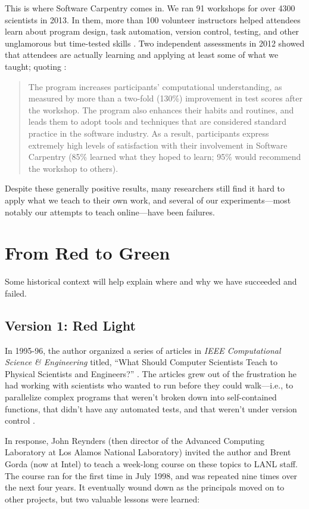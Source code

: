 \documentclass[10pt,a4paper,twocolumn]{article}
\begin{document}
This is where Software Carpentry comes in. We ran 91 workshops for
over 4300 scientists in 2013. In them, more than 100 volunteer
instructors helped attendees learn about program design, task
automation, version control, testing, and other unglamorous but
time-tested skills \cite{wilson2013}. Two independent assessments in
2012 showed that attendees are actually learning and applying at least
some of what we taught; quoting \cite{aranda2012}:

\begin{quote}
The program increases participants' computational understanding, as
measured by more than a two-fold (130\%) improvement in test scores
after the workshop. The program also enhances their habits and routines,
and leads them to adopt tools and techniques that are considered
standard practice in the software industry. As a result, participants
express extremely high levels of satisfaction with their involvement in
Software Carpentry (85\% learned what they hoped to learn; 95\% would
recommend the workshop to others).
\end{quote}

Despite these generally positive results, many researchers still find it
hard to apply what we teach to their own work, and several of our
experiments---most notably our attempts to teach online---have been
failures.

\section*{From Red to Green}

Some historical context will help explain where and why we have
succeeded and failed.

\subsection*{Version 1: Red Light}

In 1995-96, the author organized a series of articles in \emph{IEEE
Computational Science \& Engineering} titled, ``What Should Computer
Scientists Teach to Physical Scientists and Engineers?'' \cite{wilson1996}.
The articles grew out of the frustration he had working with scientists
who wanted to run before they could walk---i.e., to parallelize complex
programs that weren't broken down into self-contained functions, that
didn't have any automated tests, and that weren't under version control
\cite{wilson2006a}.

In response, John Reynders (then director of the Advanced Computing
Laboratory at Los Alamos National Laboratory) invited the author and
Brent Gorda (now at Intel) to teach a week-long course on these topics
to LANL staff. The course ran for the first time in July 1998, and was
repeated nine times over the next four years. It eventually wound down
as the principals moved on to other projects, but two valuable lessons
were learned:
\end{document}
